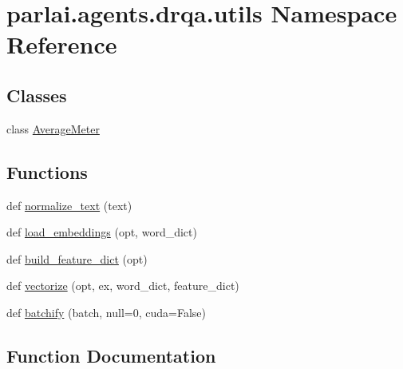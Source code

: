 \hypertarget{namespaceparlai_1_1agents_1_1drqa_1_1utils}{}\section{parlai.\+agents.\+drqa.\+utils Namespace Reference}
\label{namespaceparlai_1_1agents_1_1drqa_1_1utils}
\subsection*{Classes}
\begin{DoxyCompactItemize}
\item 
class \hyperlink{classparlai_1_1agents_1_1drqa_1_1utils_1_1AverageMeter}{Average\+Meter}
\end{DoxyCompactItemize}
\subsection*{Functions}
\begin{DoxyCompactItemize}
\item 
def \hyperlink{namespaceparlai_1_1agents_1_1drqa_1_1utils_a125ab4e64306060e9ecaa3999f7be6b6}{normalize\+\_\+text} (text)
\item 
def \hyperlink{namespaceparlai_1_1agents_1_1drqa_1_1utils_aa92d9906125210574825a20c75c199c8}{load\+\_\+embeddings} (opt, word\+\_\+dict)
\item 
def \hyperlink{namespaceparlai_1_1agents_1_1drqa_1_1utils_a14201349d4a16b48aa7929cfdbf10ebd}{build\+\_\+feature\+\_\+dict} (opt)
\item 
def \hyperlink{namespaceparlai_1_1agents_1_1drqa_1_1utils_a5c76cc39e3014c7bcf9199d566dbdc0f}{vectorize} (opt, ex, word\+\_\+dict, feature\+\_\+dict)
\item 
def \hyperlink{namespaceparlai_1_1agents_1_1drqa_1_1utils_aca22dd97c5b6dcda2a7479c1cb22ef1e}{batchify} (batch, null=0, cuda=False)
\end{DoxyCompactItemize}


\subsection{Function Documentation}
\mbox{\label{namespaceparlai_1_1agents_1_1drqa_1_1utils_aca22dd97c5b6dcda2a7479c1cb22ef1e}} 
